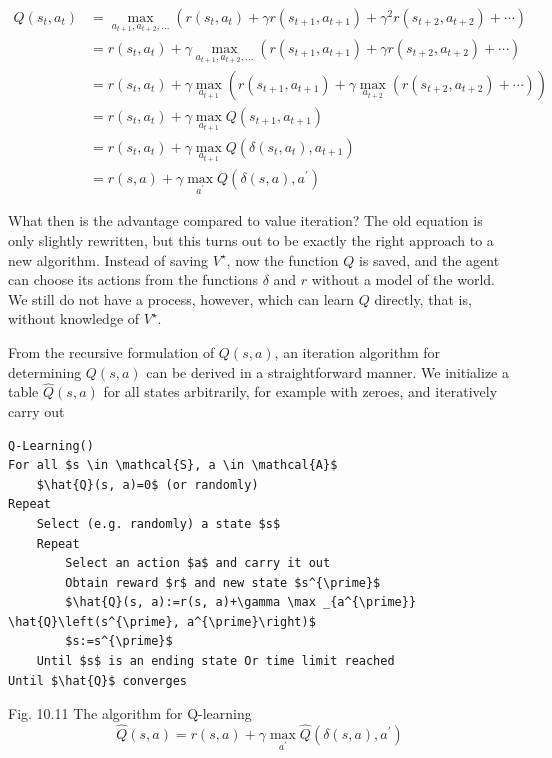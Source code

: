 \documentclass[10pt]{book}
\begin{document}
\begin{align*}
Q\left(s_{t}, a_{t}\right) & =\max _{a_{t+1}, a_{t+2}, \ldots}\left(r\left(s_{t}, a_{t}\right)+\gamma r\left(s_{t+1}, a_{t+1}\right)+\gamma^{2} r\left(s_{t+2}, a_{t+2}\right)+\cdots\right) \\
& =r\left(s_{t}, a_{t}\right)+\gamma \max _{a_{t+1}, a_{t+2}, \ldots}\left(r\left(s_{t+1}, a_{t+1}\right)+\gamma r\left(s_{t+2}, a_{t+2}\right)+\cdots\right) \\
& =r\left(s_{t}, a_{t}\right)+\gamma \max _{a_{t+1}}\left(r\left(s_{t+1}, a_{t+1}\right)+\gamma \max _{a_{t+2}}\left(r\left(s_{t+2}, a_{t+2}\right)+\cdots\right)\right) \\
& =r\left(s_{t}, a_{t}\right)+\gamma \max _{a_{t+1}} Q\left(s_{t+1}, a_{t+1}\right) \\
& =r\left(s_{t}, a_{t}\right)+\gamma \max _{a_{t+1}} Q\left(\delta\left(s_{t}, a_{t}\right), a_{t+1}\right) \\
& =r(s, a)+\gamma \max _{a^{\prime}} Q\left(\delta(s, a), a^{\prime}\right) \tag{10.11}
\end{align*}

What then is the advantage compared to value iteration? The old equation is only slightly rewritten, but this turns out to be exactly the right approach to a new algorithm. Instead of saving $V^{\star}$, now the function $Q$ is saved, and the agent can choose its actions from the functions $\delta$ and $r$ without a model of the world. We still do not have a process, however, which can learn $Q$ directly, that is, without knowledge of $V^{\star}$.

From the recursive formulation of $Q(s, a)$, an iteration algorithm for determining $Q(s, a)$ can be derived in a straightforward manner. We initialize a table $\hat{Q}(s, a)$ for all states arbitrarily, for example with zeroes, and iteratively carry out

\begin{verbatim}
Q-Learning()
For all $s \in \mathcal{S}, a \in \mathcal{A}$
    $\hat{Q}(s, a)=0$ (or randomly)
Repeat
    Select (e.g. randomly) a state $s$
    Repeat
        Select an action $a$ and carry it out
        Obtain reward $r$ and new state $s^{\prime}$
        $\hat{Q}(s, a):=r(s, a)+\gamma \max _{a^{\prime}} \hat{Q}\left(s^{\prime}, a^{\prime}\right)$
        $s:=s^{\prime}$
    Until $s$ is an ending state Or time limit reached
Until $\hat{Q}$ converges
\end{verbatim}

Fig. 10.11 The algorithm for Q-learning
\begin{equation*}
\hat{Q}(s, a)=r(s, a)+\gamma \max _{a^{\prime}} \hat{Q}\left(\delta(s, a), a^{\prime}\right) \tag{10.12}
\end{equation*}
\end{document}
